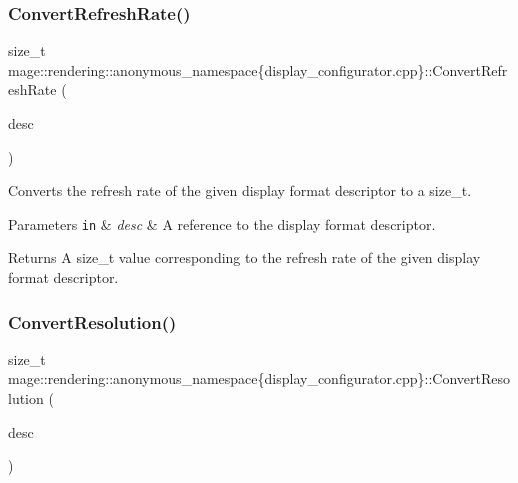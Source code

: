 \subsubsection{\texorpdfstring{Convert\+Refresh\+Rate()}{ConvertRefreshRate()}}
{\footnotesize\ttfamily size\+\_\+t mage\+::rendering\+::anonymous\+\_\+namespace\{display\+\_\+configurator.\+cpp\}\+::Convert\+Refresh\+Rate (\begin{DoxyParamCaption}\item[{const D\+X\+G\+I\+\_\+\+M\+O\+D\+E\+\_\+\+D\+E\+SC \&}]{desc }\end{DoxyParamCaption})\hspace{0.3cm}{\ttfamily [noexcept]}}

Converts the refresh rate of the given display format descriptor to a {\ttfamily size\+\_\+t}.


\begin{DoxyParams}[1]{Parameters}
\mbox{\tt in}  & {\em desc} & A reference to the display format descriptor. \\
\hline
\end{DoxyParams}
\begin{DoxyReturn}{Returns}
A {\ttfamily size\+\_\+t} value corresponding to the refresh rate of the given display format descriptor. 
\end{DoxyReturn}
\mbox{\label{namespacemage_1_1rendering_1_1anonymous__namespace_02display__configurator_8cpp_03_a8f0db6ae8408ec8ac391cff8e75e2955}} 
\subsubsection{\texorpdfstring{Convert\+Resolution()}{ConvertResolution()}}
{\footnotesize\ttfamily size\+\_\+t mage\+::rendering\+::anonymous\+\_\+namespace\{display\+\_\+configurator.\+cpp\}\+::Convert\+Resolution (\begin{DoxyParamCaption}\item[{const D\+X\+G\+I\+\_\+\+M\+O\+D\+E\+\_\+\+D\+E\+SC \&}]{desc }\end{DoxyParamCaption})\hspace{0.3cm}{\ttfamily [noexcept]}}

